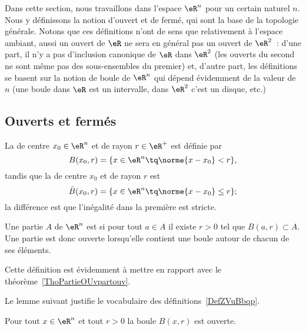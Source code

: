 Dans cette section, nous travaillons dans l'espace $\eR^n$ pour un certain naturel $n$. Nous y définissons la notion d'ouvert et de fermé, qui sont la base de la topologie générale. Notons que ces définitions n'ont de sens que relativement à l'espace ambiant, aussi un ouvert de $\eR$ ne sera en général pas un ouvert de $\eR^2$~: d'une part, il n'y a pas d'inclusion canonique de $\eR$ dans $\eR^2$ (les ouverts du second ne sont même pas des sous-ensembles du premier) et, d'autre part, les définitions se basent sur la notion de boule de $\eR^n$ qui dépend évidemment de la valeur de $n$ (une boule dans $\eR$ est un intervalle, dans $\eR^2$ c'est un disque, etc.)

\subsection{Ouverts et fermés}

\begin{definition}  \label{DefZVuBbqp}
	La  de centre $x_0 \in \eR^n$ et de rayon $r \in
	\eR^+$ est définie par
	\begin{equation}
		B(x_0,r) = \{ x \in \eR^n \tq \norme{x - x_0} < r \},
	\end{equation}
	tandis que la  de centre $x_0$ et de rayon $r$ est
	\begin{equation}
		\bar B(x_0,r) = \{ x \in \eR^n \tq \norme{x - x_0} \leq r \};
	\end{equation}
	la différence est que l'inégalité dans la première est stricte.
\end{definition}

\begin{definition}  \label{DefUOyCQtW}
    Une partie \( A\) de \( \eR^n\) est  si pour tout \( a\in A\) il existe \( r>0\) tel que \( B(a,r)\subset A\). Une partie est donc ouverte lorsqu'elle contient une boule autour de chacun de ses éléments.
\end{definition}
Cette définition est évidemment à mettre en rapport avec le théorème~\ref{ThoPartieOUvpartouv}.

Le lemme suivant justifie le vocabulaire des définitions~\ref{DefZVuBbqp}.
\begin{lemma}   \label{LemMESSExh}
    Pour tout $x \in \eR^n$ et tout $r >0$ la boule \( B(x,r)\) est ouverte.
\end{lemma}

